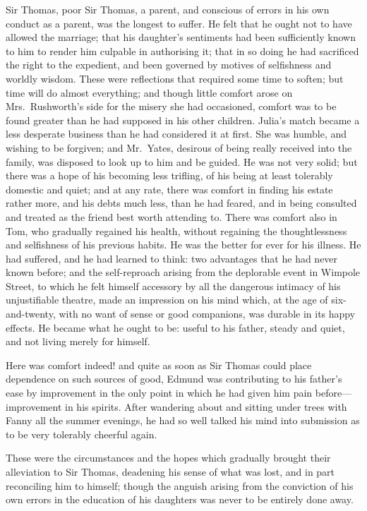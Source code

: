 \documentclass{article}
\begin{document}
Sir Thomas, poor Sir Thomas, a parent, and conscious of errors
in his own conduct as a parent, was the longest to suffer.
He felt that he ought not to have allowed the marriage;
that his daughter's sentiments had been sufficiently known
to him to render him culpable in authorising it; that in so
doing he had sacrificed the right to the expedient, and been
governed by motives of selfishness and worldly wisdom.
These were reflections that required some time to soften;
but time will do almost everything; and though little
comfort arose on Mrs.\ Rushworth's side for the misery she
had occasioned, comfort was to be found greater than he had
supposed in his other children.  Julia's match became a less
desperate business than he had considered it at first.
She was humble, and wishing to be forgiven; and Mr.\ Yates,
desirous of being really received into the family, was disposed
to look up to him and be guided.  He was not very solid;
but there was a hope of his becoming less trifling,
of his being at least tolerably domestic and quiet;
and at any rate, there was comfort in finding his estate
rather more, and his debts much less, than he had feared,
and in being consulted and treated as the friend best
worth attending to.  There was comfort also in Tom,
who gradually regained his health, without regaining the
thoughtlessness and selfishness of his previous habits.
He was the better for ever for his illness.  He had suffered,
and he had learned to think:  two advantages that he had
never known before; and the self-reproach arising from
the deplorable event in Wimpole Street, to which he felt
himself accessory by all the dangerous intimacy of his
unjustifiable theatre, made an impression on his mind which,
at the age of six-and-twenty, with no want of sense
or good companions, was durable in its happy effects.
He became what he ought to be:  useful to his father,
steady and quiet, and not living merely for himself.

Here was comfort indeed! and quite as soon as Sir
Thomas could place dependence on such sources of good,
Edmund was contributing to his father's ease by improvement
in the only point in which he had given him pain before---%
improvement in his spirits.  After wandering about and
sitting under trees with Fanny all the summer evenings,
he had so well talked his mind into submission as to be
very tolerably cheerful again.

These were the circumstances and the hopes which gradually
brought their alleviation to Sir Thomas, deadening his sense
of what was lost, and in part reconciling him to himself;
though the anguish arising from the conviction of his
own errors in the education of his daughters was never
to be entirely done away.
\end{document}
